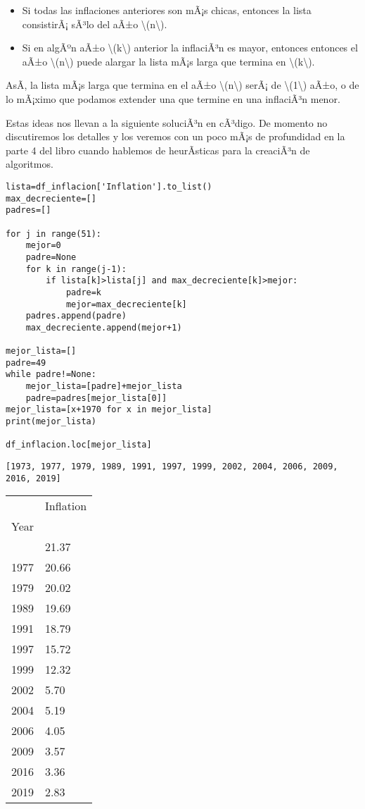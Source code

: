 \begin{itemize}
\item
  Si todas las inflaciones anteriores son mÃ¡s chicas, entonces la lista
  consistirÃ¡ sÃ³lo del aÃ±o {\textbackslash(n\textbackslash)}.
\item
  Si en algÃºn aÃ±o {\textbackslash(k\textbackslash)} anterior la
  inflaciÃ³n es mayor, entonces entonces el aÃ±o
  {\textbackslash(n\textbackslash)} puede alargar la lista mÃ¡s larga
  que termina en {\textbackslash(k\textbackslash)}.
\end{itemize}

AsÃ­, la lista mÃ¡s larga que termina en el aÃ±o
{\textbackslash(n\textbackslash)} serÃ¡ de
{\textbackslash(1\textbackslash)} aÃ±o, o de lo mÃ¡ximo que podamos
extender una que termine en una inflaciÃ³n menor.

Estas ideas nos llevan a la siguiente soluciÃ³n en cÃ³digo. De momento
no discutiremos los detalles y los veremos con un poco mÃ¡s de
profundidad en la parte 4 del libro cuando hablemos de heurÃ­sticas para
la creaciÃ³n de algoritmos.

\begin{verbatim}
lista=df_inflacion['Inflation'].to_list()
max_decreciente=[]
padres=[]

for j in range(51):
    mejor=0
    padre=None
    for k in range(j-1):
        if lista[k]>lista[j] and max_decreciente[k]>mejor:
            padre=k
            mejor=max_decreciente[k]
    padres.append(padre)
    max_decreciente.append(mejor+1)

mejor_lista=[]
padre=49
while padre!=None:
    mejor_lista=[padre]+mejor_lista
    padre=padres[mejor_lista[0]]
mejor_lista=[x+1970 for x in mejor_lista]
print(mejor_lista)

df_inflacion.loc[mejor_lista]
\end{verbatim}

\begin{verbatim}
[1973, 1977, 1979, 1989, 1991, 1997, 1999, 2002, 2004, 2006, 2009, 2016, 2019]
\end{verbatim}

\begin{longtable}[]{@{}ll@{}}
\toprule\noalign{}
& Inflation \\
Year & \\
\midrule\noalign{}
\endhead
\bottomrule\noalign{}
\endlastfoot
1973 & 21.37 \\
1977 & 20.66 \\
1979 & 20.02 \\
1989 & 19.69 \\
1991 & 18.79 \\
1997 & 15.72 \\
1999 & 12.32 \\
2002 & 5.70 \\
2004 & 5.19 \\
2006 & 4.05 \\
2009 & 3.57 \\
2016 & 3.36 \\
2019 & 2.83 \\
\end{longtable}

